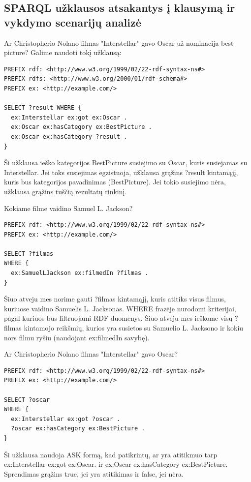 \documentclass{VUMIFPSkursinis}
\begin{document}
\subsection{SPARQL užklausos atsakantys į klausymą ir vykdymo scenarijų analizė}
Ar Christopherio Nolano filmas "Interstellar" gavo Oscar už nominacija best picture?
Galime naudoti tokį užklausą:
\begin{lstlisting}[captionpos=b, caption=Užklausa 1, label=lst:sparql,
   basicstyle=\ttfamily,frame=single]
PREFIX rdf: <http://www.w3.org/1999/02/22-rdf-syntax-ns#>
PREFIX rdfs: <http://www.w3.org/2000/01/rdf-schema#>
PREFIX ex: <http://example.com/>

SELECT ?result WHERE {
  ex:Interstellar ex:got ex:Oscar .
  ex:Oscar ex:hasCategory ex:BestPicture .
  ex:Oscar ex:hasCategory ?result .
}

\end{lstlisting}

Ši užklausa ieško kategorijos BestPicture susiejimo su Oscar, kuris susiejamas su Interstellar. Jei toks susiejimas egzistuoja, užklausa grąžins ?result kintamąjį, kuris bus kategorijos pavadinimas (BestPicture). Jei tokio susiejimo nėra, užklausa grąžins tuščią rezultatų rinkinį.
\pagebreak

Kokiame filme vaidino Samuel L. Jackson?
\begin{lstlisting}[captionpos=b, caption=Užklausa 2, label=lst:sparql,
   basicstyle=\ttfamily,frame=single]
PREFIX rdf: <http://www.w3.org/1999/02/22-rdf-syntax-ns#>
PREFIX ex: <http://example.com/>

SELECT ?filmas
WHERE {
  ex:SamuelLJackson ex:filmedIn ?filmas .
}
\end{lstlisting}

Šiuo atveju mes norime gauti ?filmas kintamąjį, kuris atitiks visus filmus, kuriuose vaidino Samuelis L. Jacksonas.
WHERE frazėje nurodomi kriterijai, pagal kuriuos bus filtruojami RDF duomenys. Šiuo atveju mes ieškome visų ?filmas kintamojo reikšmių, kurios yra susietos su Samuelio L. Jacksono ir kokiu nors filmu ryšiu (naudojant ex:filmedIn savybę).

Ar Christopherio Nolano filmas "Interstellar" gavo Oscar?
\begin{lstlisting}[captionpos=b, caption=Užklausa 3, label=lst:sparql,
   basicstyle=\ttfamily,frame=single]
PREFIX rdf: <http://www.w3.org/1999/02/22-rdf-syntax-ns#>
PREFIX ex: <http://example.com/>

SELECT ?oscar
WHERE {
  ex:Interstellar ex:got ?oscar .
  ?oscar ex:hasCategory ex:BestPicture .
}

\end{lstlisting}
Ši užklausa naudoja ASK formą, kad patikrintų, ar yra atitikmuo tarp ex:Interstellar ex:got ex:Oscar. ir ex:Oscar ex:hasCategory ex:BestPicture. 
Sprendimas grąžins true, jei yra atitikimas ir false, jei nėra.
\end{document}
